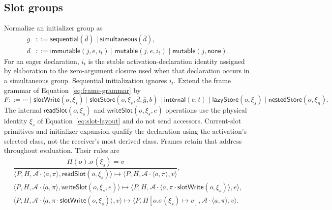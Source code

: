 \documentclass[11pt]{article}
\numberwithin{equation}{section}
\newcommand{\kw}[1]{\ensuremath{\mathsf{#1}}}
\begin{document}
\subsection{Slot groups}
\label{sec:slot-groups}

Normalize an initializer group as
\begin{equation}\label{eq:slot-group}
\begin{aligned}
 g&::=\kw{sequential}(\bar d)\mid\kw{simultaneous}(\bar d),\\
 d&::=\kw{immutable}(j,e,i_t)\mid\kw{mutable}(j,e,i_t)
       \mid\kw{mutable}(j,\kw{none}).
\end{aligned}
\end{equation}
For an eager declaration, $i_t$ is the stable activation-declaration identity
assigned by elaboration to the zero-argument closure used when that declaration
occurs in a simultaneous group.  Sequential initialization ignores $i_t$.
Extend the frame grammar of Equation~\eqref{eq:frame-grammar} by
\begin{equation}\label{eq:slot-frames}
 F::=\cdots\mid\kw{slotWrite}(o,\xi_s)
   \mid\kw{slotStore}(o,\xi_s,\bar d,\bar g,b)
   \mid\kw{internal}(\bar e,t)
   \mid\kw{lazyStore}(o,\xi_s)
   \mid\kw{nestedStore}(o,\xi_n).
\end{equation}
The internal $\kw{readSlot}(o,\xi_s)$ and $\kw{writeSlot}(o,\xi_s,e)$ operations use
the physical identity $\xi_s$ of Equation~\eqref{eq:slot-layout} and do not send
accessors.  Current-slot primitives and initializer expansion qualify the
declaration using the activation's selected class, not the receiver's most
derived class.  Frames retain that address throughout evaluation. Their rules are
\begin{equation}\label{eq:slot-operations}
\begin{array}{c}
\dfrac{H(o).\sigma(\xi_s)=v}
 {\langle P,H,\mathcal A\cdot\langle a,\pi\rangle,
    \kw{readSlot}(o,\xi_s)\rangle
  \longmapsto
  \langle P,H,\mathcal A\cdot\langle a,\pi\rangle,v\rangle},\\[4mm]
 \langle P,H,\mathcal A\cdot\langle a,\pi\rangle,
    \kw{writeSlot}(o,\xi_s,e)\rangle
 \longmapsto
 \langle P,H,\mathcal A\cdot
    \langle a,\pi\cdot\kw{slotWrite}(o,\xi_s)\rangle,e\rangle,\\[3mm]
 \langle P,H,\mathcal A\cdot
    \langle a,\pi\cdot\kw{slotWrite}(o,\xi_s)\rangle,v\rangle
 \longmapsto
 \langle P,H[o.\sigma(\xi_s)\mapsto v],
    \mathcal A\cdot\langle a,\pi\rangle,v\rangle.
\end{array}
\end{equation}
\end{document}

